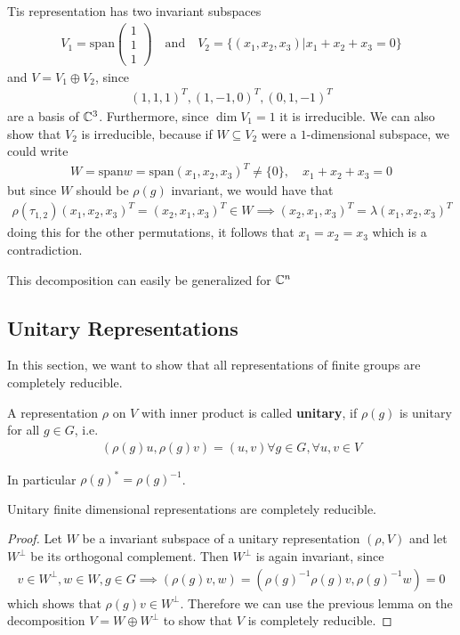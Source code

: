 Tis representation has two invariant subspaces
\begin{align*}
  V_1 = \text{span} \begin{pmatrix}
  1\\
  1\\
  1 
  \end{pmatrix}
  \quad \text{and} \quad V_2 = \{(x_1,x_2,x_3) \big\vert x_1 + x_2 + x_3 = 0 \}
\end{align*}
and $V = V_1 \oplus V_2$, since 
\begin{align*}
  (1,1,1)^{T}, (1,-1,0)^{T}, (0,1,-1)^{T}
\end{align*}
are a basis of $\mathbb{C}^{3}$.
Furthermore, since $\dim V_1 = 1$ it is irreducible. 
We can also show that $V_2$ is irreducible, because if $W \subseteq V_2$ were a $1$-dimensional subspace, we could write 
\begin{align*}
  W = \text{span} w = \text{span} (x_1,x_2,x_3)^{T} \neq \{0\}, \quad x_1+x_2+x_3 = 0
\end{align*}
but since $W$ should be $\rho(g)$ invariant, we would have that
\begin{align*}
  \rho(\tau_{1,2})(x_1,x_2,x_3)^{T} = (x_2,x_1,x_3)^{T} \in W \implies (x_2,x_1,x_3)^{T} = \lambda (x_1, x_2,x_3)^{T}
\end{align*}
doing this for the other permutations, it follows that $x_1=x_2=x_3$ which is a contradiction.

This decomposition can easily be generalized for $\mathbb{C}^{n}$
\subsection{Unitary Representations}

In this section, we want to show that all representations of finite groups are completely reducible.

\begin{dfn}[]
  A representation $\rho$ on $V$ with inner product is called \textbf{unitary}, if $\rho(g)$ is unitary for all $g \in G$, i.e.
  \begin{align*}
    (\rho(g)u, \rho(g)v) = (u,v) \forall g \in G, \forall u,v \in V
  \end{align*}
\end{dfn}
In particular $\rho(g)^{\ast} = \rho(g)^{-1}$.

\begin{thm}[]
  Unitary finite dimensional representations are completely reducible.
\end{thm}
\begin{proof}
  Let $W$ be a invariant subspace of a unitary representation $(\rho,V)$ and let $W^{\bot}$ be its orthogonal complement.
  Then $W^{\bot}$ is again invariant, since
  \begin{align*}
    v \in W^{\bot}, w \in W, g \in G \implies (\rho(g)v,w) = (\rho(g)^{-1}\rho(g)v, \rho(g)^{-1}w) = 0
  \end{align*}
  which shows that $\rho(g) v \in W^{\bot}$. Therefore we can use the previous lemma on the decomposition $V = W \oplus W^{\bot}$ to show that $V$ is completely reducible.
\end{proof}

